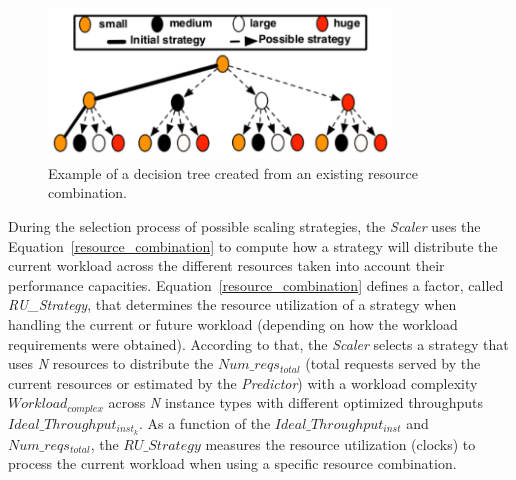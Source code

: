 \begin{figure}[htb]
  \begin{center}
    \includegraphics[width=0.85\linewidth,height=4cm]{images/optimalTree_initial}
  \end{center}
\vspace{-5mm}
  \caption{Example of a decision tree created from an existing resource combination.}
  \label{fig:scalingTree}
\end{figure}

During the selection process of possible scaling strategies, the \emph{Scaler} uses the Equation~\ref{resource_combination} to compute how a strategy will distribute the current workload across the different resources taken into account their performance capacities.  Equation~\ref{resource_combination} defines a factor, called \emph{RU\_Strategy}, that determines the resource utilization of a strategy when handling the current or future workload (depending on how the workload requirements were obtained). According to that, the \emph{Scaler} selects a strategy that uses \emph{N} resources to distribute the \emph{$Num\_reqs_{total}$} (total requests served by the current resources or estimated by the \emph{Predictor}) with a workload complexity \emph{$Workload_{complex}$} across \emph{N} instance types with different optimized throughputs \emph{$Ideal\_Throughput_{inst_{k}}$}. As a function of the \emph{$Ideal\_Throughput_{inst}$} and \emph{$Num\_reqs_{total}$}, the \emph{$RU\_Strategy$} measures the resource utilization (clocks) to process the current workload when using a specific resource combination.



